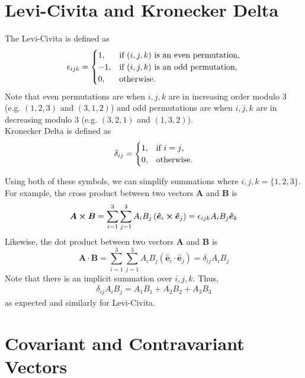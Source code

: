 \documentclass[oneside]{book}
\numberwithin{figure}{section}
\numberwithin{equation}{section}
\newcommand{\paren}[1]{\left(#1\right)}
\newcommand{\bhat}[1]{\bm{\hat{#1}}}
\newcommand{\eps}{\epsilon}
\theoremstyle{definition}
\begin{document}
	\section{Levi-Civita and Kronecker Delta}\label{sec:lckd}
	The Levi-Civita is defined as
	\begin{equation}
		\eps_{ijk} = \begin{cases}
			1, & \text{if $ (i,j,k) $ is an even permutation,}\\
			-1, & \text{if $ (i,j,k) $ is an odd permutation,}\\
			0, & \text{otherwise.}
		\end{cases}
	\end{equation}
	Note that even permutations are when $ i,j,k $ are in increasing order modulo 3 (e.g. $ (1,2,3) $ and $ (3,1,2) $) and odd permutations are when $ i,j,k $ are in decreasing modulo 3 (e.g. $ (3,2,1) $ and $ (1,3,2) $).\\
	
	Kronecker Delta is defined as
	\begin{equation}
		\delta_{ij} = \begin{cases}
			1, & \text{if $ i = j $,}\\
			0, & \text{otherwise.}
		\end{cases}
	\end{equation}

	Using both of these symbols, we can simplify summations where $ i,j,k = \{1,2,3\} $. For example, the cross product between two vectors $ \bm{A} $ and $ \bm{B} $ is
	\begin{equation}
		\bm{A} \cross \bm{B} = \sum_{i = 1}^{3}\sum_{j = 1}^{3}A_iB_j\paren{\bhat{e}_i \cross \bhat{e}_j} = \eps_{ijk}A_iB_j\bhat{e}_k
	\end{equation}
	Likewise, the dot product between two vectors $ \bm{A} $ and $ \bm{B} $ is
	\begin{equation}
		\bm{A} \cdot \bm{B} = \sum_{i = 1}^{3}\sum_{j = 1}^{3}A_iB_j\paren{\bhat{e}_i \cdot \bhat{e}_j} = \delta_{ij}A_iB_j
	\end{equation}
	Note that there is an implicit summation over $ i,j,k $. Thus,
	\begin{align*}
		\delta_{ij}A_iB_j = A_1B_1 + A_2B_2 + A_3B_3
	\end{align*}
	as expected and similarly for Levi-Civita.

	\section{Covariant and Contravariant Vectors}
\end{document}
